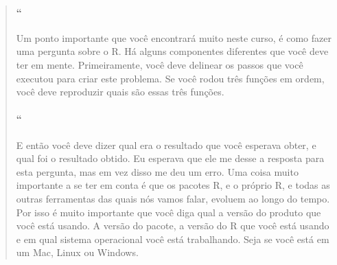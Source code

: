 \begin{quotation}
\begin{small}
\paragraph{``}
Um ponto importante que você encontrará muito neste curso, é como fazer uma pergunta sobre o R. Há alguns componentes diferentes  que você deve ter em mente. Primeiramente, você deve delinear os passos que você executou para criar este problema. Se você rodou três funções em ordem, você deve reproduzir quais são essas três funções.

\paragraph{``}
E então você deve dizer qual era o resultado que você esperava obter, e qual foi o resultado obtido. Eu esperava que ele me desse a resposta para esta pergunta, mas em vez disso me deu um erro. Uma coisa muito importante a se ter em conta é que os pacotes R, e o próprio R, e todas as outras ferramentas das quais nós vamos falar, evoluem ao longo do tempo. Por isso é muito importante que você diga qual a versão do produto que você está usando. A versão do pacote, a versão do R que você está usando e em qual sistema operacional você está trabalhando. Seja se você está em um Mac, Linux ou Windows.


\end{small}
\end{quotation}
